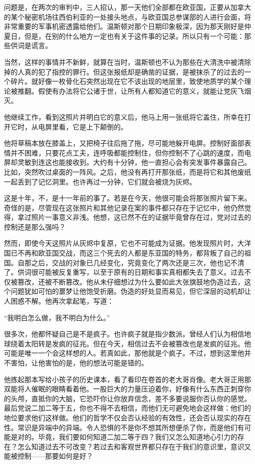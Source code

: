 问题是，在两次的审判中，三人招认，那一天他们全部都在欧亚国，正要从加拿大的某个秘密机场往西伯利亚的一处接头地点，与欧亚国总参谋部的人进行会面，将非常重要的军事机密透露给他们。温斯顿对那个日期印象极深，因为那天刚好是仲夏日，但是，在别的什么地方一定也有关于这件事的记录。所以只有一个可能：那些供词是谎言。

当然，这样的事情并不新鲜，就算在当时，温斯顿也不认为那些在大清洗中被清除掉的人真的犯了指控的罪行。但这张报纸却是确凿的证据，是被抹杀了的过去的一个碎片。就好像一枚骨化石突然出现在它不该出现的地层里，致使地质学的某个理论被推翻。假使有办法将它公诸于世，让所有人都知道它的意义，就能让党灰飞烟灭。

他继续工作，看到这照片并明白它的意义后，他马上用一张纸将它盖住，所幸在打开它时，从电屏里看，它是上下颠倒的。

他将草稿本放在膝盖上，又把椅子往后拖了拖，尽可能地躲开电屏。控制好面部表情并不困难，只要花点工夫，连呼吸都能控制住，但你控制不了心跳的速度，而电屏却灵敏到连这也能接收到。大约有十分钟，他一直担心会有突发事件暴露自己。比如，突然吹过桌面的一阵风。之后，他没有再打开那张纸，而是将它和其他废纸一起丢到了记忆洞里。也许再过一分钟，它们就会被烧为灰烬。

这是十年，不，是十一年前的事了。若是在今天，他很可能会将那张照片留下来。奇怪的是，尽管现在这张照片和其他记录在案的事件都只存在于记忆中，他仍然觉得，拿过照片一事意义非浅。他想，这已然不在的证据毕竟曾存在过，党对过去的控制还是那么强吗？

然而，即使今天这照片从灰烬中复原，它也不可能成为证据。他发现照片时，大洋国已不再和欧亚国交战，而这三个死去的人都是东亚国的特务，都背叛了自己的祖国。自那之后，交战的对象已几经变化，究竟变化了两次还是三次，他也记不清了。供词很可能被反复重写，以至于原有的日期和事实真相都失去了意义。过去不仅被篡改，还被不断篡改。他从未仔细想过为什么要如此大张旗鼓地伪造过去，这个问题犹如可怕的噩梦让他饱受折磨。伪造的好处显而易见，但它深层的动机却让人困惑不解。他再次拿起笔，写道：

``我明白怎么做，我不明白为什么。''

很多次，他都怀疑自己是不是疯子。也许疯子就是指少数派。曾经人们认为相信地球绕着太阳转是发疯的征兆。但在今天，相信过去不会被篡改也是发疯的征兆。他可能是唯一一个会这样想的人。若真如此，那他就是个疯子。不过，想到这里他并不害怕，让他害怕的是，他的想法可能是错的。

他拣起那本写给小孩子的历史课本，看了看印在卷首的老大哥肖像。老大哥正用那双能将人催眠的眼睛看着他。一股巨大的力量压迫着你，好像有什么东西正刺穿你的头颅，直抵你的大脑，它恐吓你让你放弃信念，差不多要说服你否认你的感觉。最后党说二加二等于五，你也不得不去相信，而他们无可避免地会这样做：他们的地位要求他们这样做。他们的哲学不仅会否认经验的有效性，还会否认现实的存在性。常识是异端中的异端。令人恐惧的不是你不想其所想便杀了你，而是他们有可能是对的。毕竟，我们要如何知道二加二等于四？我们又怎么知道地心引力的存在？怎么知道过去不可改变？若过去和客观世界都只存在于我们的意识里，意识又能被控制------那要如何是好？

